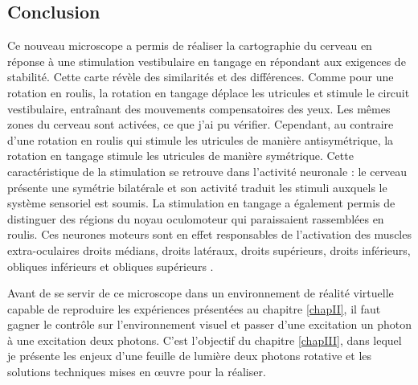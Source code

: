 \subsection{Conclusion}

Ce nouveau microscope a permis de réaliser la cartographie du cerveau en réponse à une stimulation vestibulaire en tangage en répondant aux exigences de stabilité. Cette carte révèle des similarités et des différences. Comme pour une rotation en roulis, la rotation en tangage déplace les utricules et stimule le circuit vestibulaire, entraînant des mouvements compensatoires des yeux. Les mêmes zones du cerveau sont activées, ce que j'ai pu vérifier. Cependant, au contraire d'une rotation en roulis qui stimule les utricules de manière antisymétrique, la rotation en tangage stimule les utricules de manière symétrique. Cette caractéristique de la stimulation se retrouve dans l'activité neuronale : le cerveau présente une symétrie bilatérale et son activité traduit les stimuli auxquels le système sensoriel est soumis. La stimulation en tangage a également permis de distinguer des régions du noyau oculomoteur qui paraissaient rassemblées en roulis. Ces neurones moteurs sont en effet responsables de l'activation des muscles extra-oculaires droits médians, droits latéraux, droits supérieurs, droits inférieurs, obliques inférieurs et obliques supérieurs \cite{straka_vestibular_2013}\cite{straka_connecting_2014}.

Avant de se servir de ce microscope dans un environnement de réalité virtuelle capable de reproduire les expériences présentées au chapitre \ref{chapII}, il faut gagner le contrôle sur l'environnement visuel et passer d'une excitation un photon à une excitation deux photons. C'est l'objectif du chapitre \ref{chapIII}, dans lequel je présente les enjeux d'une feuille de lumière deux photons rotative et les solutions techniques mises en œuvre pour la réaliser.